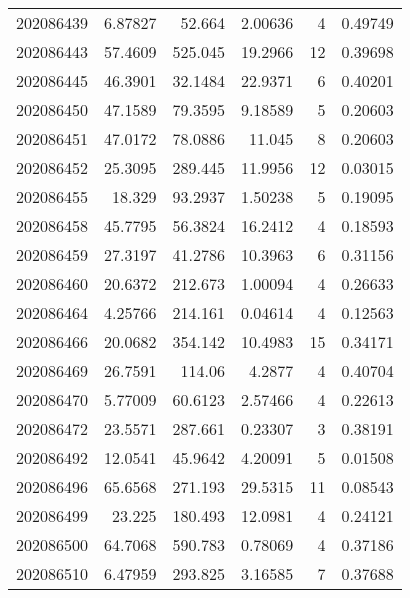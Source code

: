 \begin{tabular}{rrrrrr}
 202086439 &          6.87827 &       52.664  &            2.00636 &           4 & 0.49749 \\
 202086443 &         57.4609  &      525.045  &           19.2966  &          12 & 0.39698 \\
 202086445 &         46.3901  &       32.1484 &           22.9371  &           6 & 0.40201 \\
 202086450 &         47.1589  &       79.3595 &            9.18589 &           5 & 0.20603 \\
 202086451 &         47.0172  &       78.0886 &           11.045   &           8 & 0.20603 \\
 202086452 &         25.3095  &      289.445  &           11.9956  &          12 & 0.03015 \\
 202086455 &         18.329   &       93.2937 &            1.50238 &           5 & 0.19095 \\
 202086458 &         45.7795  &       56.3824 &           16.2412  &           4 & 0.18593 \\
 202086459 &         27.3197  &       41.2786 &           10.3963  &           6 & 0.31156 \\
 202086460 &         20.6372  &      212.673  &            1.00094 &           4 & 0.26633 \\
 202086464 &          4.25766 &      214.161  &            0.04614 &           4 & 0.12563 \\
 202086466 &         20.0682  &      354.142  &           10.4983  &          15 & 0.34171 \\
 202086469 &         26.7591  &      114.06   &            4.2877  &           4 & 0.40704 \\
 202086470 &          5.77009 &       60.6123 &            2.57466 &           4 & 0.22613 \\
 202086472 &         23.5571  &      287.661  &            0.23307 &           3 & 0.38191 \\
 202086492 &         12.0541  &       45.9642 &            4.20091 &           5 & 0.01508 \\
 202086496 &         65.6568  &      271.193  &           29.5315  &          11 & 0.08543 \\
 202086499 &         23.225   &      180.493  &           12.0981  &           4 & 0.24121 \\
 202086500 &         64.7068  &      590.783  &            0.78069 &           4 & 0.37186 \\
 202086510 &          6.47959 &      293.825  &            3.16585 &           7 & 0.37688 \\

\end{tabular}
